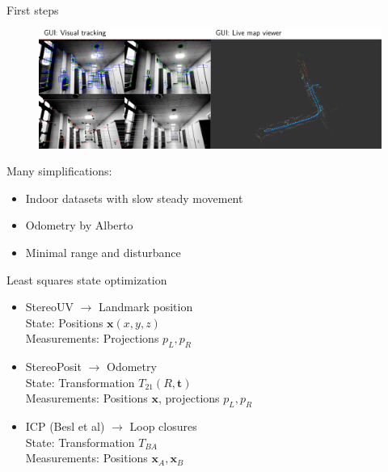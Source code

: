 \documentclass[11pt]{beamer}
\begin{document}
\begin{frame}{First steps}
\begin{figure}[!htb]
\centering
\includegraphics[width=\textwidth]{figures/introduction/first_steps.pdf}
\end{figure}
Many simplifications:
\begin{itemize}
\item Indoor datasets with slow steady movement
\item Odometry by Alberto\texttrademark
\item Minimal range and disturbance
\end{itemize}
\end{frame}

\begin{frame}{Least squares state optimization}
\begin{itemize}
\item StereoUV $\to$ Landmark position\\\vspace{5pt}
\hspace{10pt}State: Positions $\mathbf{x}(x,y,z)$\\
\hspace{10pt}Measurements: Projections $p_L,p_R$\\
\vspace{10pt}
\item StereoPosit $\to$ Odometry\\\vspace{5pt}
\hspace{10pt}State: Transformation $T_{21}(R,\mathbf{t})$\\
\hspace{10pt}Measurements: Positions $\mathbf{x}$, projections $p_L,p_R$\\
\vspace{10pt}
\item ICP (Besl et al) $\to$ Loop closures\\\vspace{5pt}
\hspace{10pt}State: Transformation $T_{BA}$\\
\hspace{10pt}Measurements: Positions $\mathbf{x}_A,\mathbf{x}_B$\\
\vspace{10pt}
\end{itemize}
\end{frame}
\end{document}
